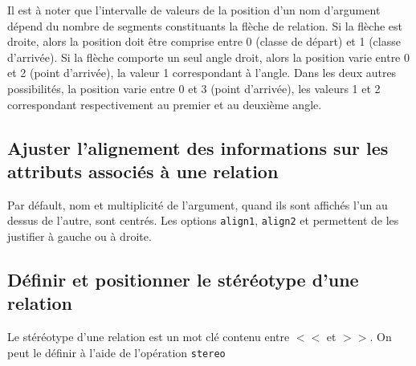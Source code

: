 \documentclass[a4paper,11pt]{report}
\newcommand{\inputTikZ}[1]{%
  }%
\newcommand{\inputTikZ}[1]{%
    \texttt{[image: fig/\#1.pdf]}%
  }%
\begin{document}
\medskip

\begin{minipage}{0.5\textwidth}

\end{minipage}
\begin{minipage}{0.4\textwidth}
\begin{center}
\inputTikZ{figure17}
\end{center}
\end{minipage}

\medskip

Il est à noter que l'intervalle de valeurs de la position d'un nom d'argument dépend du nombre de segments constituants la flèche de relation. Si la flèche est droite, alors la position doit être comprise entre 0 (classe de départ) et 1 (classe d'arrivée). Si la flèche comporte un seul angle droit, alors la position varie entre 0 et 2 (point d'arrivée), la valeur 1 correspondant à l'angle. Dans les deux autres possibilités, la position varie entre 0 et 3 (point d'arrivée), les valeurs 1 et 2 correspondant respectivement au premier et au deuxième angle.

\subsection{Ajuster l'alignement des informations sur les attributs associés à une relation}

Par défault, nom et multiplicité de l'argument, quand ils sont affichés l'un au dessus de l'autre, sont centrés. Les options {\tt align1}, {\tt align2} et {\tt } permettent de les justifier à gauche ou à droite.

\medskip

\begin{minipage}{0.5\textwidth}

\end{minipage}
\begin{minipage}{0.4\textwidth}
\begin{center}
\inputTikZ{figure18}
\end{center}
\end{minipage}

\subsection{Définir et positionner le stéréotype d'une relation}

Le stéréotype d'une relation est un mot clé contenu entre $<<$ et $>>$. On peut le définir à l'aide de l'opération {\tt stereo}
\end{document}
